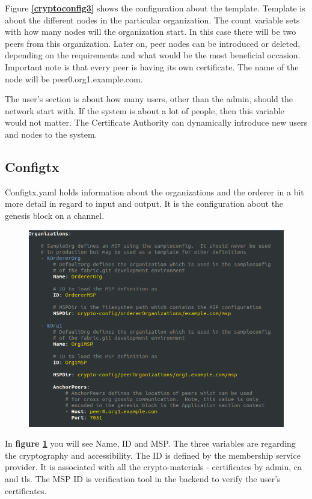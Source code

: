 \documentclass[a4paper,11pt]{report}
\begin{document}
Figure \textbf{\ref{cryptoconfig3}} shows the configuration about the template. Template is about the different nodes in the particular organization. The count variable sets with how many nodes will the organization start. In this case there will be two peers from this organization. Later on, peer nodes can be introduced or deleted, depending on the requirements and what would be the most beneficial occasion. Important note is that every peer is having its own certificate. The name of the node will be peer0.org1.example.com. 

The user's section is about how many users, other than the admin, should the network start with. If the system is about a lot of people, then this variable would not matter. The Certificate Authority can dynamically introduce new users and nodes to the system. 

\subsection{Configtx}

Configtx.yaml holds information about the organizations and the orderer in a bit more detail in regard to input and output. It is the configuration about the genesis block on a channel. 

\begin{figure}[h]
\centering
  \includegraphics[width = 16cm]{configtx1.png}
  \caption{ }
  \label{configtx1}
\end{figure}

In \textbf{figure \ref{configtx1}} you will see Name, ID and MSP. The three variables are regarding the cryptography and accessibility. The ID is defined by the membership service provider. It is associated with all the crypto-materials - certificates by admin, ca and tls. The MSP ID is verification tool in the backend to verify the user's certificates.
  
\end{document}
